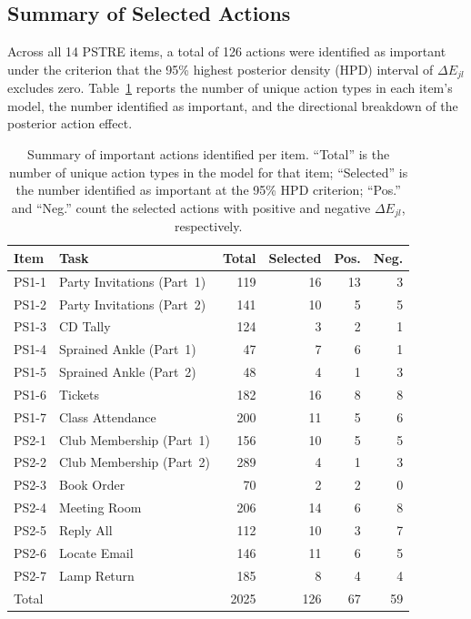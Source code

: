 \documentclass[A4paper,11pt]{article}
\begin{document}


\subsection{Summary of Selected Actions}

Across all 14 PSTRE items, a total of 126 actions were identified as important under the criterion that the 95\% highest posterior density (HPD) interval of $\Delta E_{jl}$ excludes zero. Table~\ref{tab:selected_actions} reports the number of unique action types in each item's model, the number identified as important, and the directional breakdown of the posterior action effect.

\begin{table}[htb]
\centering
\caption{Summary of important actions identified per item. ``Total'' is the number of unique action types in the model for that item; ``Selected'' is the number identified as important at the 95\% HPD criterion; ``Pos.'' and ``Neg.'' count the selected actions with positive and negative $\Delta E_{jl}$, respectively.}
\label{tab:selected_actions}
\begin{tabular}{llrrrr}
\toprule
Item & Task & Total & Selected & Pos. & Neg. \\
\midrule
PS1-1 & Party Invitations (Part~1) & 119 & 16 & 13 & 3 \\
PS1-2 & Party Invitations (Part~2) & 141 & 10 &  5 & 5 \\
PS1-3 & CD Tally                   & 124 &  3 &  2 & 1 \\
PS1-4 & Sprained Ankle (Part~1)    &  47 &  7 &  6 & 1 \\
PS1-5 & Sprained Ankle (Part~2)    &  48 &  4 &  1 & 3 \\
PS1-6 & Tickets                    & 182 & 16 &  8 & 8 \\
PS1-7 & Class Attendance           & 200 & 11 &  5 & 6 \\
\midrule
PS2-1 & Club Membership (Part~1)   & 156 & 10 &  5 & 5 \\
PS2-2 & Club Membership (Part~2)   & 289 &  4 &  1 & 3 \\
PS2-3 & Book Order                 &  70 &  2 &  2 & 0 \\
PS2-4 & Meeting Room               & 206 & 14 &  6 & 8 \\
PS2-5 & Reply All                  & 112 & 10 &  3 & 7 \\
PS2-6 & Locate Email               & 146 & 11 &  6 & 5 \\
PS2-7 & Lamp Return                & 185 &  8 &  4 & 4 \\
\midrule
Total &                            & 2025 & 126 & 67 & 59 \\
\bottomrule
\end{tabular}
\end{table}
\end{document}
